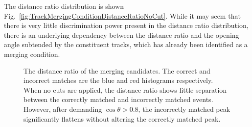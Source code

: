 The distance ratio distribution is shown Fig.~\ref{fig:TrackMergingConditionDistanceRatioNoCut}.  While it may seem that there is very little discrimination power present in the distance ratio distribution, there is an underlying dependency between the distance ratio and the opening angle subtended by the constituent tracks, which has already been identified as a merging condition.
\begin{figure}
  \centering
  \caption{The distance ratio of the merging candidates.  The correct and incorrect matches are the blue and red histograms respectively.  When no cuts are applied, the distance ratio shows little separation between the correctly matched and incorrectly matched events.  However, after demanding $\cos\theta > 0.8$, the incorrectly matched peak significantly flattens without altering the correctly matched peak.}
  \label{fig:TrackMergingConditionDistanceRatio}
\end{figure}
